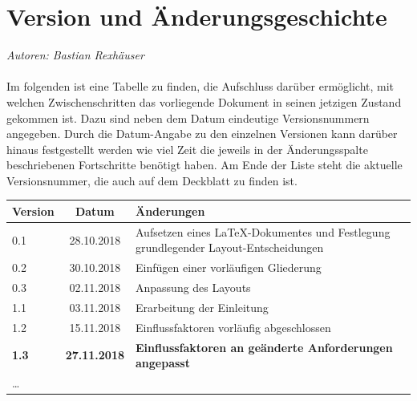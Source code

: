 \documentclass[enabledeprecatedfontcommands,fontsize=11pt,paper=a4,twoside]{scrartcl}
\newcounter{one}
\renewcommand{\headrulewidth}{0pt}
\begin{document}
  \thispagestyle{fancy}
  \fancyhead{}
  \fancyfoot{}
  \renewcommand{\headrulewidth}{0.4pt}
  \tableofcontents

\newpage



\section*{Version und Änderungsgeschichte}
\emph{Autoren: Bastian Rexhäuser}\\ \\
Im folgenden ist eine Tabelle zu finden, die Aufschluss darüber ermöglicht, mit welchen Zwischenschritten das vorliegende Dokument in seinen jetzigen Zustand gekommen ist. Dazu sind neben dem Datum eindeutige Versionsnummern angegeben. Durch die Datum-Angabe zu den einzelnen Versionen kann darüber hinaus festgestellt werden wie viel Zeit die jeweils in der Änderungsspalte beschriebenen Fortschritte benötigt haben. Am Ende der Liste steht die aktuelle Versionsnummer, die auch auf dem Deckblatt zu finden ist.  \\

\begin{tabular}{p{}cp{12cm}}
Version & Datum & Änderungen \\
\hline
0.1 & 28.10.2018 & Aufsetzen eines LaTeX-Dokumentes  und Festlegung grundlegender Layout-Entscheidungen \\
0.2 & 30.10.2018 & Einfügen einer vorläufigen Gliederung \\
0.3 & 02.11.2018 & Anpassung des Layouts \\
1.1 & 03.11.2018 & Erarbeitung der Einleitung \\
1.2 & 15.11.2018 & Einflussfaktoren vorläufig abgeschlossen \\
\textbf{1.3} & \textbf{27.11.2018} & \textbf{Einflussfaktoren an geänderte Anforderungen angepasst} \\
\ldots
\end{tabular}
\\ \\ \\
\end{document}
